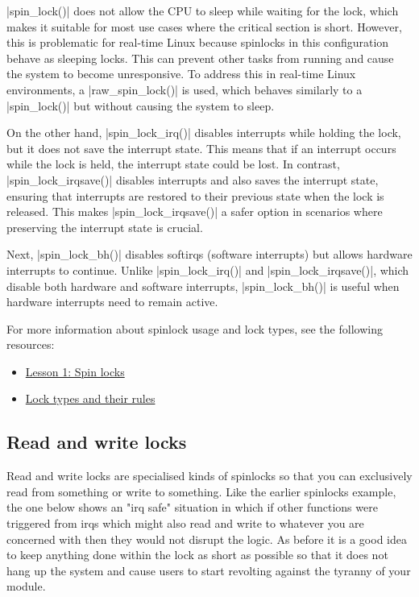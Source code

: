 \documentclass[10pt, oneside]{book}
\begin{document}
\cpp|spin_lock()| does not allow the CPU to sleep while waiting for the lock, which makes it suitable for most use cases where the critical section is short.
However, this is problematic for real-time Linux because spinlocks in this configuration behave as sleeping locks.
This can prevent other tasks from running and cause the system to become unresponsive.
To address this in real-time Linux environments, a \cpp|raw_spin_lock()| is used, which behaves similarly to a \cpp|spin_lock()| but without causing the system to sleep.

On the other hand, \cpp|spin_lock_irq()| disables interrupts while holding the lock, but it does not save the interrupt state.
This means that if an interrupt occurs while the lock is held, the interrupt state could be lost.
In contrast, \cpp|spin_lock_irqsave()| disables interrupts and also saves the interrupt state, ensuring that interrupts are restored to their previous state when the lock is released.
This makes \cpp|spin_lock_irqsave()| a safer option in scenarios where preserving the interrupt state is crucial.

Next, \cpp|spin_lock_bh()| disables softirqs (software interrupts) but allows hardware interrupts to continue.
Unlike \cpp|spin_lock_irq()| and \cpp|spin_lock_irqsave()|, which disable both hardware and software interrupts, \cpp|spin_lock_bh()| is useful when hardware interrupts need to remain active.

For more information about spinlock usage and lock types, see the following resources:
 \begin{itemize}
  \item \href{https://www.kernel.org/doc/Documentation/locking/spinlocks.txt}{Lesson 1: Spin locks}
  \item\href{https://docs.kernel.org/locking/locktypes.html}{Lock types and their rules}
 \end{itemize}

\subsection{Read and write locks}
\label{sec:rwlock}
Read and write locks are specialised kinds of spinlocks so that you can exclusively read from something or write to something.
Like the earlier spinlocks example, the one below shows an "irq safe" situation in which if other functions were triggered from irqs which might also read and write to whatever you are concerned with then they would not disrupt the logic.
As before it is a good idea to keep anything done within the lock as short as possible so that it does not hang up the system and cause users to start revolting against the tyranny of your module.
\end{document}
